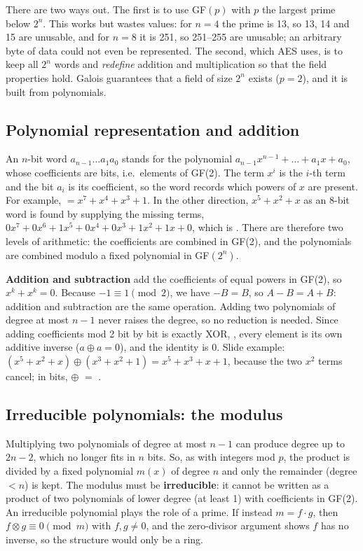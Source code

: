 There are two ways out. The first is to use GF$(p)$ with $p$ the largest prime below $2^n$. This works but wastes values: for $n = 4$ the prime is 13, so 13, 14 and 15 are unusable, and for $n = 8$ it is 251, so 251--255 are unusable; an arbitrary byte of data could not even be represented. The second, which AES uses, is to keep all $2^n$ words and \emph{redefine} addition and multiplication so that the field properties hold. Galois guarantees that a field of size $2^n$ exists ($p = 2$), and it is built from polynomials.

\subsection{Polynomial representation and addition}
An $n$-bit word $a_{n-1} \dots a_1 a_0$ stands for the polynomial $a_{n-1}x^{n-1} + \dots + a_1 x + a_0$, whose coefficients are bits, i.e.\ elements of GF(2). The term $x^i$ is the $i$-th term and the bit $a_i$ is its coefficient, so the word records which powers of $x$ are present. For example,  $= x^7 + x^4 + x^3 + 1$. In the other direction, $x^5 + x^2 + x$ as an 8-bit word is found by supplying the missing terms, $0x^7 + 0x^6 + 1x^5 + 0x^4 + 0x^3 + 1x^2 + 1x + 0$, which is . There are therefore two levels of arithmetic: the coefficients are combined in GF(2), and the polynomials are combined modulo a fixed polynomial in GF$(2^n)$.

\textbf{Addition and subtraction} add the coefficients of equal powers in GF(2), so $x^k + x^k = 0$. Because $-1 \equiv 1 \pmod 2$, we have $-B = B$, so $A - B = A + B$: addition and subtraction are the same operation. Adding two polynomials of degree at most $n - 1$ never raises the degree, so no reduction is needed. Since adding coefficients mod 2 bit by bit is exactly XOR, , every element is its own additive inverse ($a \oplus a = 0$), and the identity is 0. Slide example: $(x^5 + x^2 + x) \oplus (x^3 + x^2 + 1) = x^5 + x^3 + x + 1$, because the two $x^2$ terms cancel; in bits,  $\oplus$  $=$ .

\subsection{Irreducible polynomials: the modulus}
Multiplying two polynomials of degree at most $n - 1$ can produce degree up to $2n - 2$, which no longer fits in $n$ bits. So, as with integers mod $p$, the product is divided by a fixed polynomial $m(x)$ of degree $n$ and only the remainder (degree $< n$) is kept. The modulus must be \textbf{irreducible}: it cannot be written as a product of two polynomials of lower degree (at least 1) with coefficients in GF(2). An irreducible polynomial plays the role of a prime. If instead $m = f \cdot g$, then $f \otimes g \equiv 0 \pmod m$ with $f, g \ne 0$, and the zero-divisor argument shows $f$ has no inverse, so the structure would only be a ring.

